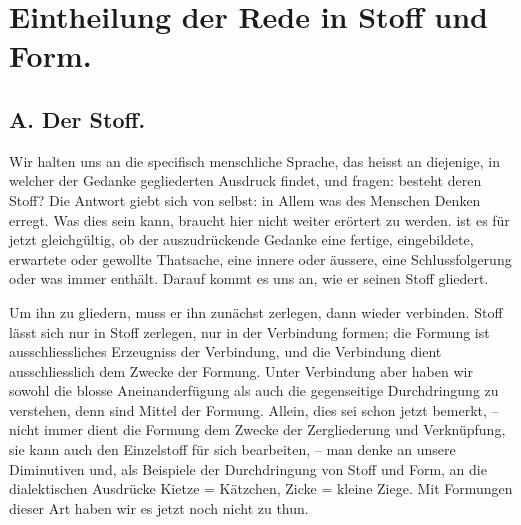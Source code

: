 
\section*{Eintheilung der Rede in Stoff und Form.}
\subsection*{}
\subsection*{A. Der Stoff.}

Wir halten uns  an die specifisch menschliche Sprache, das heisst an diejenige, in welcher der Gedanke gegliederten Ausdruck findet, und fragen:  besteht deren Stoff? Die Antwort giebt sich von selbst: in Allem was des Menschen Denken erregt. Was  dies sein kann, braucht hier nicht weiter erörtert zu werden.  ist es für jetzt gleichgültig, ob der auszudrückende Gedanke eine fertige, eingebildete, erwartete oder gewollte Thatsache, eine innere oder äussere, eine Schlussfolgerung oder was immer enthält. Darauf kommt es uns an, wie er seinen Stoff gliedert.

Um ihn zu gliedern, muss er ihn zunächst zerlegen, dann wieder verbinden. Stoff lässt sich nur in Stoff zerlegen, nur in der Verbindung formen; die Formung ist ausschliessliches Erzeugniss der Verbindung, und die Verbindung dient ausschliesslich dem Zwecke der Formung. Unter Verbindung aber haben wir sowohl die blosse Aneinanderfügung als auch die gegenseitige Durchdringung zu verstehen, denn  sind Mittel der  Formung. Allein, dies sei schon jetzt bemerkt, – nicht immer dient die Formung dem Zwecke der Zergliederung und Verknüpfung, sie kann auch den Einzelstoff für sich bearbeiten, – man denke an unsere Diminutiven und, als Beispiele der Durchdringung von Stoff und Form, an die dialektischen Ausdrücke Kietze = Kätzchen, Zicke = kleine Ziege. Mit Formungen dieser Art haben wir es jetzt noch nicht zu thun.

